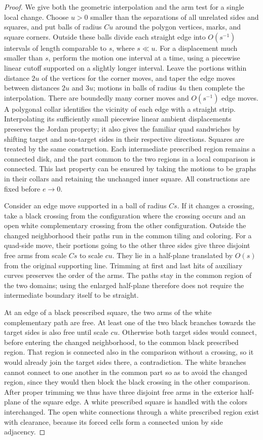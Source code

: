 \begin{proof}
We give both the geometric interpolation and the arm test for a single local
change. Choose $u>0$ smaller than the separations of all unrelated sides and
squares, and put balls of radius $Cu$ around the polygon vertices, marks,
and square corners. Outside these balls divide each straight edge into
$O(s^{-1})$ intervals of length comparable to $s$, where $s\ll u$. For a
displacement much smaller than $s$, perform the motion one interval at a time,
using a piecewise linear cutoff supported on a slightly longer interval.
Leave the portions within distance $2u$ of the vertices for the corner
moves, and taper the edge moves between distances $2u$ and $3u$; motions in
balls of radius $4u$ then complete the interpolation. There are boundedly
many corner moves and $O(s^{-1})$ edge moves. A polygonal collar identifies
the vicinity of each edge with a straight strip. Interpolating its sufficiently
small piecewise linear ambient displacements preserves the Jordan property;
it also gives the familiar quad sandwiches by shifting target and non-target
sides in their respective directions. Squares are treated by the same
construction. Each intermediate prescribed region remains a connected disk,
and the part common to the two regions in a local comparison is connected.
This last property can be ensured by taking the motions to be graphs in their
collars and retaining the unchanged inner square. All constructions are
fixed before $e\to0$.

Consider an edge move supported in a ball of radius $Cs$. If it changes a
crossing, take a black crossing from the configuration where the crossing
occurs and an open white complementary crossing from the other configuration.
Outside the changed neighborhood their paths run in the common tiling and
coloring. For a quad-side move, their portions going to the other three sides
give three disjoint free arms from scale $Cs$ to scale $cu$. They lie in a
half-plane translated by $O(s)$ from the original supporting line. Trimming
at first and last hits of auxiliary curves preserves the order of the arms.
The paths stay in the common region of the two domains; using the enlarged
half-plane therefore does not require the intermediate boundary itself to
be straight.

At an edge of a black prescribed square, the two arms of the white
complementary path are free. At least one of the two black branches towards
the target sides is also free until scale $cu$. Otherwise both target sides
would connect, before entering the changed neighborhood, to the common
black prescribed region. That region is connected also in the comparison
without a crossing, so it would already join the target sides there, a
contradiction. The white branches cannot connect to one another in the common
part so as to avoid the changed region, since they would then block the black
crossing in the other comparison. After proper trimming we thus have three
disjoint free arms in the exterior half-plane of the square edge. A white
prescribed square is handled with the colors interchanged. The open white
connections through a white prescribed region exist with clearance, because
its forced cells form a connected union by side adjacency.


\end{proof}
